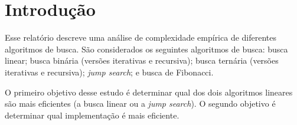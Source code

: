 \chapter{Introdução}

Esse relatório descreve uma análise de complexidade empírica de diferentes algoritmos de busca. São considerados os seguintes algoritmos de busca: busca linear; busca binária (versões iterativas e recursiva); busca ternária (versões iterativas e recursiva); {\it jump search}; e busca de Fibonacci.

O primeiro objetivo desse estudo é determinar qual dos dois algoritmos lineares são mais eficientes (a busca linear ou a {\it jump search}). O segundo objetivo é determinar qual implementação é mais eficiente.
